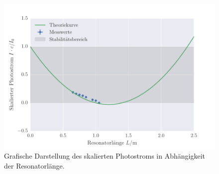 \begin{figure}[!h]
 \centering
 \includegraphics[scale=0.8]{../Grafiken/Stabilitaetsbedingung.pdf}
 \caption{Grafische Darstellung des skalierten Photostroms in Abhängigkeit der Resonatorlänge.\label{fig:stabilitaetsbedingung}}
 \end{figure} 